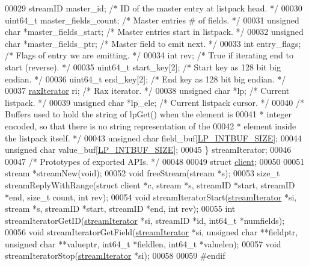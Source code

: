 \begin{DoxyCode}
00029     streamID master\_id;     \textcolor{comment}{/* ID of the master entry at listpack head. */}
00030     uint64\_t master\_fields\_count;       \textcolor{comment}{/* Master entries # of fields. */}
00031     \textcolor{keywordtype}{unsigned} \textcolor{keywordtype}{char} *master\_fields\_start; \textcolor{comment}{/* Master entries start in listpack. */}
00032     \textcolor{keywordtype}{unsigned} \textcolor{keywordtype}{char} *master\_fields\_ptr;   \textcolor{comment}{/* Master field to emit next. */}
00033     \textcolor{keywordtype}{int} entry\_flags;                    \textcolor{comment}{/* Flags of entry we are emitting. */}
00034     \textcolor{keywordtype}{int} rev;                \textcolor{comment}{/* True if iterating end to start (reverse). */}
00035     uint64\_t start\_key[2];  \textcolor{comment}{/* Start key as 128 bit big endian. */}
00036     uint64\_t end\_key[2];    \textcolor{comment}{/* End key as 128 bit big endian. */}
00037     \hyperlink{structraxIterator}{raxIterator} ri;         \textcolor{comment}{/* Rax iterator. */}
00038     \textcolor{keywordtype}{unsigned} \textcolor{keywordtype}{char} *lp;      \textcolor{comment}{/* Current listpack. */}
00039     \textcolor{keywordtype}{unsigned} \textcolor{keywordtype}{char} *lp\_ele;  \textcolor{comment}{/* Current listpack cursor. */}
00040     \textcolor{comment}{/* Buffers used to hold the string of lpGet() when the element is}
00041 \textcolor{comment}{     * integer encoded, so that there is no string representation of the}
00042 \textcolor{comment}{     * element inside the listpack itself. */}
00043     \textcolor{keywordtype}{unsigned} \textcolor{keywordtype}{char} field\_buf[\hyperlink{listpack_8h_ab31e5c173b595ae4e703b72eb435a6e9}{LP\_INTBUF\_SIZE}];
00044     \textcolor{keywordtype}{unsigned} \textcolor{keywordtype}{char} value\_buf[\hyperlink{listpack_8h_ab31e5c173b595ae4e703b72eb435a6e9}{LP\_INTBUF\_SIZE}];
00045 \} streamIterator;
00046 
00047 \textcolor{comment}{/* Prototypes of exported APIs. */}
00048 
00049 \textcolor{keyword}{struct} \hyperlink{structclient}{client};
00050 
00051 stream *streamNew(\textcolor{keywordtype}{void});
00052 \textcolor{keywordtype}{void} freeStream(stream *s);
00053 size\_t streamReplyWithRange(\textcolor{keyword}{struct} client *c, stream *s, streamID *start, streamID *end, size\_t count,
       \textcolor{keywordtype}{int} rev);
00054 \textcolor{keywordtype}{void} streamIteratorStart(\hyperlink{structstreamIterator}{streamIterator} *si, stream *s, streamID *start, streamID *end, \textcolor{keywordtype}{
      int} rev);
00055 \textcolor{keywordtype}{int} streamIteratorGetID(\hyperlink{structstreamIterator}{streamIterator} *si, streamID *id, int64\_t *numfields);
00056 \textcolor{keywordtype}{void} streamIteratorGetField(\hyperlink{structstreamIterator}{streamIterator} *si, \textcolor{keywordtype}{unsigned} \textcolor{keywordtype}{char} **fieldptr, \textcolor{keywordtype}{unsigned} \textcolor{keywordtype}{char} 
      **valueptr, int64\_t *fieldlen, int64\_t *valuelen);
00057 \textcolor{keywordtype}{void} streamIteratorStop(\hyperlink{structstreamIterator}{streamIterator} *si);
00058 
00059 \textcolor{preprocessor}{#}\textcolor{preprocessor}{endif}
\end{DoxyCode}
